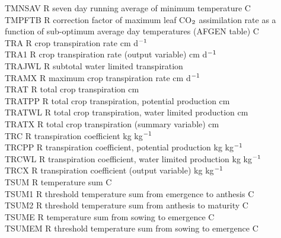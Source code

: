 \begin{tabbing}
TMNSAV\> \> R\> seven day running average of minimum temperature\> \> \> \> \> \> \> \degrees C\\
TMPFTB\> \> R\> correction factor of maximum leaf CO$_{{\rm 2}}$ assimilation rate as a\\
\>\> \> function of sub-optimum average day temperatures (AFGEN table)\> \> \> \> \> \> \> \degrees C\\
TRA\> \> R\> crop transpiration rate\> \> \> \> \> \> \> cm d$^{{\rm -1}}$\\
TRA1\> \> R\> crop transpiration rate (output variable)\> \> \> \> \> \> \> cm d$^{{\rm -1}}$\\
TRAJWL\> \> R\> subtotal water limited transpiration\\
TRAMX\> \> R\> maximum crop transpiration rate\> \> \> \> \> \> \> cm d$^{{\rm -1}}$\\
TRAT\> \> R\> total crop transpiration\> \> \> \> \> \> \> cm\\
TRATPP\> \> R\> total crop transpiration, potential production\> \> \> \> \> \> \> cm\\
TRATWL\> \> R\> total crop transpiration, water limited production\> \> \> \> \> \> \> cm\\
TRATX\> \> R\> total crop transpiration (summary variable)\> \> \> \> \> \> \> cm\\
TRC    \> \> R   \> transpiration coefficient  \> \> \> \> \> \> \> kg kg$^{{\rm -1}}$\\
TRCPP\> \> R   \> transpiration coefficient, potential production  \> \> \> \> \> \> \> kg kg$^{{\rm -1}}$\\
TRCWL\> \> R   \> transpiration coefficient, water limited production  \> \> \> \> \> \> \> kg kg$^{{\rm -1}}$\\
TRCX\> \> R   \> transpiration coefficient (output variable)\> \> \> \> \> \> \> kg kg$^{{\rm -1}}$\\
TSUM\> \> R\> temperature sum\> \> \> \> \> \> \> \degrees C\\
TSUM1\> \> R\> threshold temperature sum from emergence to anthesis\> \> \> \> \> \> \> \degrees C\\
TSUM2\> \> R\> threshold temperature sum from anthesis to maturity\> \> \> \> \> \> \> \degrees C\\
TSUME\> \> R\> temperature sum from sowing to emergence\> \> \> \> \> \> \> \degrees C\\
TSUMEM\> \> R\> threshold temperature sum from sowing to emergence\> \> \> \> \> \> \> \degrees C\\

\end{tabbing}
